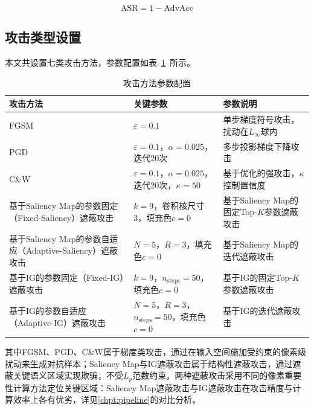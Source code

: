 \begin{equation}
  \text{ASR} = 1 - \text{AdvAcc}
\end{equation}



\subsection{攻击类型设置}

本文共设置七类攻击方法，参数配置如表~\ref{tab:attack_config}~所示。

\begin{table}[htbp]
  \centering
  \caption{攻击方法参数配置}
  \label{tab:attack_config}
  \begin{tabular}{p{4.5cm}p{2.5cm}p{5.5cm}}
    \toprule
    \textbf{攻击方法} & \textbf{关键参数} & \textbf{参数说明} \\
    \midrule
    FGSM \cite{goodfellow2015fgsm}
      & $\varepsilon = 0.1$
      & 单步梯度符号攻击，扰动在$L_\infty$球内 \\
    PGD \cite{madry2018pgd}
      & $\varepsilon=0.1$，$\alpha=0.025$，迭代20次
      & 多步投影梯度下降攻击 \\
    C\&W \cite{carlini2017cw}
      & $\varepsilon=0.1$，$\alpha=0.025$，迭代20次，$\kappa=50$
      & 基于优化的强攻击，$\kappa$控制置信度 \\
    基于Saliency Map的参数固定（Fixed-Saliency）遮蔽攻击
      & $k=9$，卷积核尺寸3，填充色$c=0$
      & 基于Saliency Map的固定Top-$K$参数遮蔽攻击  \\
    基于Saliency Map的参数自适应（Adaptive-Saliency）遮蔽攻击
      & $N=5$，$R=3$，填充色$c=0$
      & 基于Saliency Map的迭代遮蔽攻击 \\
    基于IG的参数固定（Fixed-IG）遮蔽攻击
      & $k=9$，$n_{\text{steps}}=50$，填充色$c=0$
      & 基于IG的固定Top-$K$参数遮蔽攻击 \\
    基于IG的参数自适应（Adaptive-IG）遮蔽攻击
      & $N=5$，$R=3$，$n_{\text{steps}}=50$，填充色$c=0$
      & 基于IG的迭代遮蔽攻击 \\
    \bottomrule
  \end{tabular}
\end{table}

其中FGSM、PGD、C\&W属于梯度类攻击，通过在输入空间施加受约束的像素级扰动来生成对抗样本；Saliency Map与IG遮蔽攻击属于结构性遮蔽攻击，通过遮蔽关键语义区域实现欺骗，不受$L_p$范数约束。两种遮蔽攻击采用不同的像素重要性计算方法定位关键区域：Saliency Map遮蔽攻击与IG遮蔽攻击在攻击精度与计算效率上各有优劣，详见\ref{chpt:pipeline}的对比分析。

